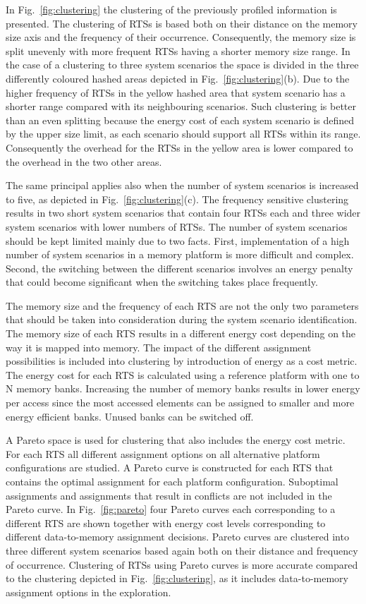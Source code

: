 \documentclass[a4paper,conference]{IEEEtran}
\begin{document}
In Fig.~\ref{fig:clustering} the clustering of the previously profiled information is presented. The clustering of RTSs is based both on their distance on the memory size axis and the frequency of their occurrence. Consequently, the memory size is split unevenly with more frequent RTSs having a shorter memory size range. In the case of a clustering to three system scenarios the space is divided in the three differently coloured hashed areas depicted in Fig.~\ref{fig:clustering}(b). Due to the higher frequency of RTSs in the yellow hashed area that system scenario has a shorter range compared with its neighbouring scenarios. Such clustering is better than an even splitting because the energy cost of each system scenario is defined by the upper size limit, as each scenario should support all RTSs within its range. Consequently the overhead for the RTSs in the yellow area is lower compared to the overhead in the two other areas.

The same principal applies also when the number of system scenarios is increased to five, as depicted in Fig.~\ref{fig:clustering}(c). The frequency sensitive clustering results in two short system scenarios that contain four RTSs each and three wider system scenarios with lower numbers of RTSs. The number of system scenarios should be kept limited mainly due to two facts. First, implementation of a high number of system scenarios in a memory platform is more difficult and complex. Second, the switching between the different scenarios involves an energy penalty that could become significant when the switching takes place frequently.

The memory size and the frequency of each RTS are not the only two parameters that should be taken into consideration during the system scenario identification. The memory size of each RTS results in a different energy cost depending on the way it is mapped into memory. The impact of the different assignment possibilities is included into clustering by introduction of energy as a cost metric. The energy cost for each RTS is calculated using a reference platform with one to N
memory banks. Increasing the number of memory banks results in lower energy per access since the most accessed elements can be assigned to smaller and more energy efficient banks. Unused banks can be switched off.

A Pareto space is used for clustering that also includes the energy cost metric. For each RTS all different assignment options on all alternative platform configurations are studied. A Pareto curve is constructed for each RTS that contains the optimal assignment for each platform configuration. Suboptimal assignments and assignments that result in conflicts are not included in the Pareto curve. In Fig.~\ref{fig:pareto} four Pareto curves each corresponding to a different RTS are shown together with energy cost levels corresponding to different data-to-memory assignment decisions. Pareto curves are clustered into three different system scenarios based again both on their distance and frequency of occurrence. Clustering of RTSs using Pareto curves is more accurate compared to the clustering depicted in Fig.~\ref{fig:clustering}, as it includes   data-to-memory assignment options in the exploration. 
\end{document}
